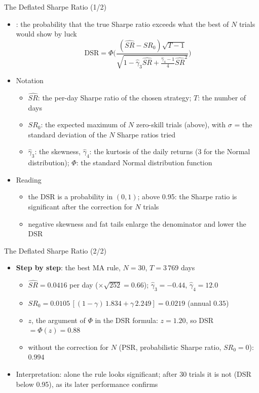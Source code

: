 \begin{frame}{The Deflated Sharpe Ratio (1/2)}
\itemsize{\small}
\begin{itemize}
    \item {}: the probability that the true Sharpe ratio exceeds what the best of $N$ trials would show by luck \[ \mathrm{DSR} = \Phi\Big(\dfrac{(\widehat{SR} - SR_0)\sqrt{T - 1}}{\sqrt{1 - \hat\gamma_3\widehat{SR} + \frac{\hat\gamma_4 - 1}{4}\widehat{SR}^2}}\Big) \]
    \item Notation
    \begin{itemize}
        \item $\widehat{SR}$: the per-day Sharpe ratio of the chosen strategy; $T$: the number of days
        \item $SR_0$: the expected maximum of $N$ zero-skill trials (above), with $\sigma$ = the standard deviation of the $N$ Sharpe ratios tried
        \item $\hat\gamma_3$: the skewness, $\hat\gamma_4$: the kurtosis of the daily returns (3 for the Normal distribution); $\Phi$: the standard Normal distribution function
    \end{itemize}
    \item Reading
    \begin{itemize}
        \item the DSR is a probability in $(0, 1)$; above 0.95: the Sharpe ratio is significant after the correction for $N$ trials
        \item negative skewness and fat tails enlarge the denominator and lower the DSR
    \end{itemize}
\end{itemize}
\end{frame}

\begin{frame}{The Deflated Sharpe Ratio (2/2)}
\itemsize{\small}
\begin{itemize}
    \item \textbf{Step by step}: the best MA rule, $N = 30$, $T = 3\,769$ days
    \begin{itemize}
        \item $\widehat{SR} = 0.0416$ per day ($\times\sqrt{252} = 0.66$); $\hat\gamma_3 = -0.44$, $\hat\gamma_4 = 12.0$
        \item $SR_0 = 0.0105\,[(1 - \gamma)\,1.834 + \gamma\,2.249] = 0.0219$ (annual $0.35$)
        \item $z$, the argument of $\Phi$ in the DSR formula: $z = 1.20$, so DSR $= \Phi(z) = 0.88$
        \item without the correction for $N$ (PSR, probabilistic Sharpe ratio, $SR_0 = 0$): $0.994$
    \end{itemize}
    \item Interpretation: alone the rule looks significant; after 30 trials it is not (DSR below 0.95), as its later performance confirms
\end{itemize}
\end{frame}


